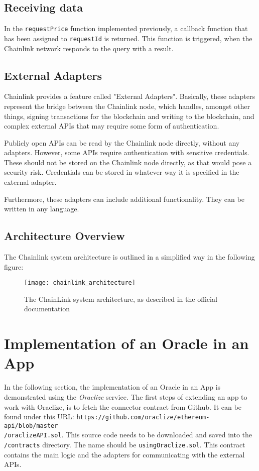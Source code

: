 \subsection*{Receiving data}
In the \texttt{requestPrice} function implemented previously, a callback function that has been assigned to \texttt{requestId} is returned. This function is triggered, when the Chainlink network responds to the query with a result. 
\subsection*{External Adapters}
Chainlink provides a feature called "External Adapters". Basically, these adapters represent the bridge between the Chainlink node, which handles, amongst other things, signing transactions for the blockchain and writing to the blockchain, and complex external APIs that may require some form of authentication.

Publicly open APIs can be read by the Chainlink node directly, without any adapters. However, some APIs require authentication with sensitive credentials. These should not be stored on the Chainlink node directly, as that would pose a security risk. Credentials can be stored in whatever way it is specified in the external adapter.

Furthermore, these adapters can include additional functionality. They can be written in any language\cite{chainlinkdoc}.

\newpage

\subsection*{Architecture Overview}
The Chainlink system architecture is outlined in a simplified way in the following figure:
\begin{figure}[H]
\centering
\texttt{[image: chainlink\_architecture]}
\caption{The ChainLink system architecture, as described in the official documentation\cite{chainlinkdoc}}
\end{figure}

\section{Implementation of an Oracle in an App}
In the following section, the implementation of an Oracle in an App is demonstrated using the \emph{Oraclize} service. The first steps of extending an app to work with Oraclize, is to fetch the connector contract from Github. It can be found under this URL: \texttt{https://github.com/oraclize/ethereum-api/blob/master
\\
/oraclizeAPI.sol}. This source code needs to be downloaded and saved into the \texttt{/contracts} directory. The name should be \texttt{usingOraclize.sol}. This contract contains the main logic and the adapters for communicating with the external APIs.


